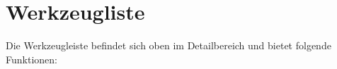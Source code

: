 \section{Werkzeugliste\label{transactions-functions}}

Die Werkzeugleiste befindet sich oben im Detailbereich und bietet folgende Funktionen:

